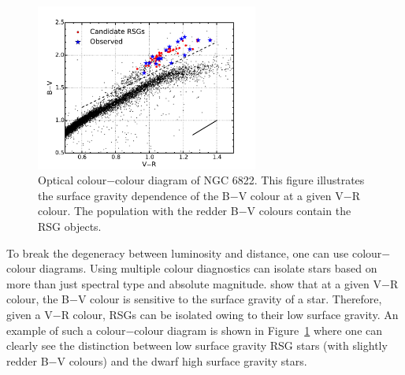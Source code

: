  \begin{figure}
 \centering
 \includegraphics[width=0.65\textwidth]{intro/N6822_bvr}
 \caption[B$-$V, V$-$R]{Optical colour$-$colour diagram of NGC 6822. This figure illustrates the surface gravity dependence of the B$-$V colour at a given V$-$R colour. The population with the redder B$-$V colours contain the RSG objects.
 \label{fig:CCD}}
\end{figure}


To break the degeneracy between luminosity and distance, one can use colour$-$colour diagrams.
Using multiple colour diagnostics can isolate stars based on more than just spectral type and absolute magnitude.
\cite{1998ApJ...501..153M} show that at a given V$-$R colour, the B$-$V colour is sensitive to the surface gravity of a star.
Therefore, given a V$-$R colour, RSGs can be isolated owing to their low surface gravity.
An example of such a colour$-$colour diagram is shown in Figure~\ref{fig:CCD} where one can clearly see the distinction between low surface gravity RSG stars (with slightly redder B$-$V colours) and the dwarf high surface gravity stars.


